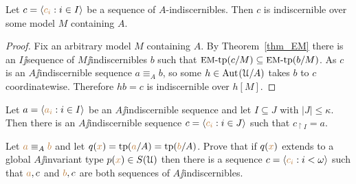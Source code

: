 \documentclass[creche.tex]{subfiles}
\begin{document}
\begin{proposition}\label{prop_indiscernibles_set_model}
  Let $c=\langle{\color{brown}c_i}:i\in I\rangle$ be a sequence of $A$-indiscernibles. Then $c$ is indiscernible over some model $M$ containing $A$.
\end{proposition}

\begin{proof}
  Fix an arbitrary model $M$ containing $A$. By Theorem~\ref{thm_EM} there is an $I\jj$sequence of $M\jj$indiscernibles $b$ such that $\textrm{{\small EM}\mbox{-}tp}(c/M)\subseteq\textrm{{\small EM}\mbox{-}tp}(b/M)$. As $c$ is an $A\jj$indiscernible sequence $a\equiv_Ab$, so some $h\in\textrm{Aut\kern.15ex}(\EuScript U/A)$ takes $b$ to $c$ coordinatewise. Therefore $hb=c$ is indiscernible over $h[M]$.
\end{proof}

\begin{exercise}
Let $a=\langle{\color{brown}a_i}:i\in I\rangle$ be an $A\jj$indiscernible sequence and let $I\subseteq J$ with $|J|\le \kappa$. Then there is an $A\jj$indiscernible sequence $c=\langle{\color{brown}c_i}:i\in J\rangle$ such that $c_{\restriction I}=a$.\QED
\end{exercise}

\begin{exercise}
Let ${\color{brown} a}\equiv_A{\color{brown} b}$ and let $q({\color{brown} x})={\rm tp}({\color{brown} a}/A)={\rm tp}({\color{brown} b}/A)$. Prove that if $q({\color{brown} x})$ extends to a global $A\jj$invariant type $p({\color{brown} x})\in S(\EuScript U)$ then there is a sequence $c=\langle{\color{brown}c_i}:i<\omega\rangle$ such that ${\color{brown} a},c$ and ${\color{brown} b},c$ are both sequences of $A\jj$indiscernibles.\QED
\end{exercise}
\end{document}
